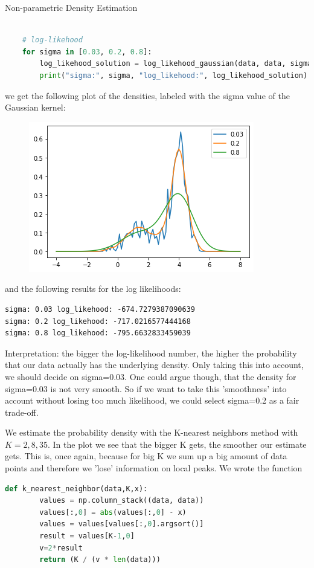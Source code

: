 \documentclass[
ngerman,
]{tudaexercise}
\begin{document}
\begin{task}{Non-parametric Density Estimation}
\begin{subtask}
\begin{lstlisting}[language=Python]
	
	# log-likehood
	for sigma in [0.03, 0.2, 0.8]:
		log_likehood_solution = log_likehood_gaussian(data, data, sigma)
		print("sigma:", sigma, "log_likehood:", log_likehood_solution)
	\end{lstlisting}
	we get the following plot of the densities, labeled with the sigma value of the Gaussian kernel:
	\begin{figure}[H]
		\includegraphics{3bplot.png}
	\end{figure}
and the following results for the log likelihoods:
\begin{lstlisting}
sigma: 0.03 log_likehood: -674.7279387090639
sigma: 0.2 log_likehood: -717.0216577444168
sigma: 0.8 log_likehood: -795.6632833459039
\end{lstlisting}
Interpretation: the bigger the log-likelihood number, the higher the probability that our data actually has the underlying density. Only taking this into account, we should decide on sigma=0.03. One could argue though, that the density for sigma=0.03 is not very smooth. So if we want to take this 'smoothness' into account without losing too much likelihood, we could select sigma=0.2 as a fair trade-off.
	\end{subtask}
\begin{subtask}
	We estimate the probability density with the K-nearest neighbors method with $K=2,8,35$. In the plot we see that the bigger K gets, the smoother our estimate gets. This is, once again, because for big K we sum up a big amount of data points and therefore we 'lose' information on local peaks. We wrote the function
	\begin{lstlisting}[language=Python]
	def k_nearest_neighbor(data,K,x):
		values = np.column_stack((data, data))
		values[:,0] = abs(values[:,0] - x)
		values = values[values[:,0].argsort()]
		result = values[K-1,0]
		v=2*result
		return (K / (v * len(data)))
	\end{lstlisting}

\end{subtask}
\end{task}
\end{document}
